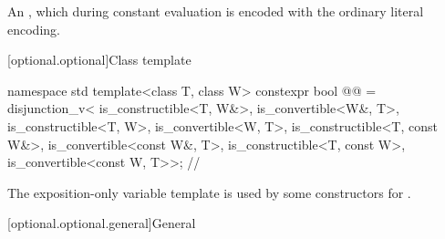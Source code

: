 \begin{itemdescr}
\pnum
\returns
An  \ntbs{}, which during constant evaluation is encoded with the ordinary literal encoding.
\end{itemdescr}

[optional.optional]{Class template }

\begin{codeblock}
namespace std {
  template<class T, class W>
  constexpr bool @@ = disjunction_v<
      is_constructible<T, W&>, is_convertible<W&, T>, is_constructible<T, W>,
      is_convertible<W, T>, is_constructible<T, const W&>, is_convertible<const W&, T>,
      is_constructible<T, const W>, is_convertible<const W, T>>; // \expos
}
\end{codeblock}

\pnum
The exposition-only variable template  is used by some constructors for .

[optional.optional.general]{General}

